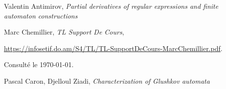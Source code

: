 \begin{enumerate}[label={[\arabic*]}, noitemsep, itemsep=2mm]
  \item Valentin Antimirov, \textit{Partial derivatives of regular expressions 
  and finite automaton constructions}
  \item Marc Chemillier, \textit{TL \- Support De Cours}, 
  
  \href{https://infosetif.do.am/S4/TL/TL-SupportDeCours-MarcChemillier.pdf}
  {https://infosetif.do.am/S4/TL/TL-SupportDeCours-MarcChemillier.pdf}. 
  
  Consulté le \today.
  \item Pascal Caron, Djelloul Ziadi, \textit{Characterization of Glushkov 
  automata}
\end{enumerate}